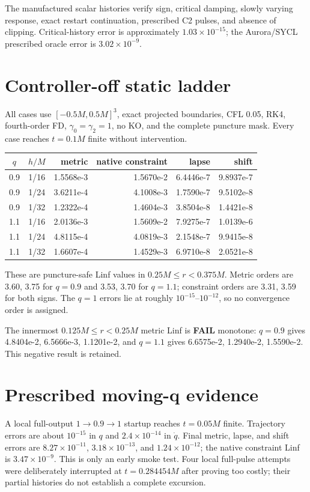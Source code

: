 \documentclass[10pt]{article}
\newcommand{\Fail}{\textcolor{fail}{\textbf{FAIL}}}
\begin{document}
The manufactured scalar histories verify sign, critical damping, slowly
varying response, exact restart continuation, prescribed C2 pulses, and absence
of clipping.  Critical-history error is approximately $1.03\times10^{-15}$;
the Aurora/SYCL prescribed oracle error is $3.02\times10^{-9}$.

\section{Controller-off static ladder}

All cases use $[-0.5M,0.5M]^3$, exact projected boundaries, CFL 0.05, RK4,
fourth-order FD, $\gamma_0=\gamma_2=1$, no KO, and the complete puncture mask.
Every case reaches $t=0.1M$ finite without intervention.

\begin{center}\small
\begin{tabular}{ccrrrr}
\toprule
$q$ & $h/M$ & metric & native constraint & lapse & shift\\
\midrule
0.9 & 1/16 & 1.5568e-3 & 1.5670e-2 & 6.4446e-7 & 9.8937e-7\\
0.9 & 1/24 & 3.6211e-4 & 4.1008e-3 & 1.7590e-7 & 9.5102e-8\\
0.9 & 1/32 & 1.2322e-4 & 1.4604e-3 & 3.8504e-8 & 1.4421e-8\\
1.1 & 1/16 & 2.0136e-3 & 1.5609e-2 & 7.9275e-7 & 1.0139e-6\\
1.1 & 1/24 & 4.8115e-4 & 4.0819e-3 & 2.1548e-7 & 9.9415e-8\\
1.1 & 1/32 & 1.6607e-4 & 1.4529e-3 & 6.9710e-8 & 2.0521e-8\\
\bottomrule
\end{tabular}
\end{center}
These are puncture-safe Linf values in $0.25M\leq r<0.375M$.  Metric orders
are 3.60, 3.75 for $q=0.9$ and 3.53, 3.70 for $q=1.1$; constraint orders are
3.31, 3.59 for both signs.  The $q=1$ errors lie at roughly
$10^{-15}$--$10^{-12}$, so no convergence order is assigned.

The innermost $0.125M\leq r<0.25M$ metric Linf is \Fail{} monotone:
$q=0.9$ gives 4.8404e-2, 6.5666e-3, 1.1201e-2, and $q=1.1$ gives
6.6575e-2, 1.2940e-2, 1.5590e-2.  This negative result is retained.

\section{Prescribed moving-q evidence}

A local full-output $1\rightarrow0.9\rightarrow1$ startup reaches $t=0.05M$
finite.  Trajectory errors are about $10^{-15}$ in $q$ and
$2.4\times10^{-14}$ in $\dot q$.  Final metric, lapse, and shift errors are
$8.27\times10^{-11}$, $3.18\times10^{-13}$, and $1.24\times10^{-12}$; the
native constraint Linf is $3.47\times10^{-9}$.  This is only an early smoke
test.  Four local full-pulse attempts were deliberately interrupted at
$t=0.284454M$ after proving too costly; their partial histories do not establish
a complete excursion.
\end{document}
